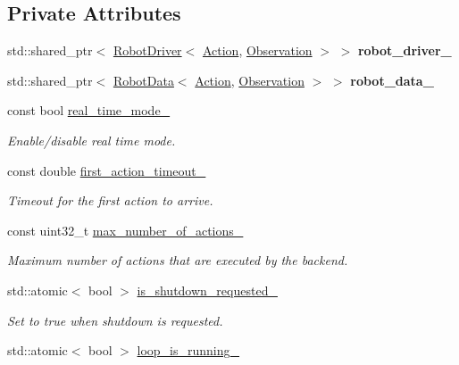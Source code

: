 \subsection*{Private Attributes}
\begin{DoxyCompactItemize}
\item 
std\+::shared\+\_\+ptr$<$ \hyperlink{classrobot__interfaces_1_1RobotDriver}{Robot\+Driver}$<$ \hyperlink{classAction}{Action}, \hyperlink{classObservation}{Observation} $>$ $>$ {\bfseries robot\+\_\+driver\+\_\+}\hypertarget{classrobot__interfaces_1_1RobotBackend_a9c07b9b4a8c98b3f1b63d0754cbcb85b}{}\label{classrobot__interfaces_1_1RobotBackend_a9c07b9b4a8c98b3f1b63d0754cbcb85b}

\item 
std\+::shared\+\_\+ptr$<$ \hyperlink{classrobot__interfaces_1_1RobotData}{Robot\+Data}$<$ \hyperlink{classAction}{Action}, \hyperlink{classObservation}{Observation} $>$ $>$ {\bfseries robot\+\_\+data\+\_\+}\hypertarget{classrobot__interfaces_1_1RobotBackend_a4bb04e584d971d4d99a32ea8c5b0cd68}{}\label{classrobot__interfaces_1_1RobotBackend_a4bb04e584d971d4d99a32ea8c5b0cd68}

\item 
const bool \hyperlink{classrobot__interfaces_1_1RobotBackend_a81610183c52c9fe2088304bbd3b6f83f}{real\+\_\+time\+\_\+mode\+\_\+}
\begin{DoxyCompactList}\small\item\em Enable/disable real time mode. \end{DoxyCompactList}\item 
const double \hyperlink{classrobot__interfaces_1_1RobotBackend_a56f111a9e0663eedefbaf55de36f7cac}{first\+\_\+action\+\_\+timeout\+\_\+}
\begin{DoxyCompactList}\small\item\em Timeout for the first action to arrive. \end{DoxyCompactList}\item 
const uint32\+\_\+t \hyperlink{classrobot__interfaces_1_1RobotBackend_a7cac555549bff96a32da042a97919d47}{max\+\_\+number\+\_\+of\+\_\+actions\+\_\+}
\begin{DoxyCompactList}\small\item\em Maximum number of actions that are executed by the backend. \end{DoxyCompactList}\item 
std\+::atomic$<$ bool $>$ \hyperlink{classrobot__interfaces_1_1RobotBackend_abe24206dcf102b33f8ee472e287f485a}{is\+\_\+shutdown\+\_\+requested\+\_\+}
\begin{DoxyCompactList}\small\item\em Set to true when shutdown is requested. \end{DoxyCompactList}\item 
std\+::atomic$<$ bool $>$ \hyperlink{classrobot__interfaces_1_1RobotBackend_a0e91800b352b7b52f22820775b1d5e99}{loop\+\_\+is\+\_\+running\+\_\+}\hypertarget{classrobot__interfaces_1_1RobotBackend_a0e91800b352b7b52f22820775b1d5e99}{}\label{classrobot__interfaces_1_1RobotBackend_a0e91800b352b7b52f22820775b1d5e99}


\end{DoxyCompactItemize}
